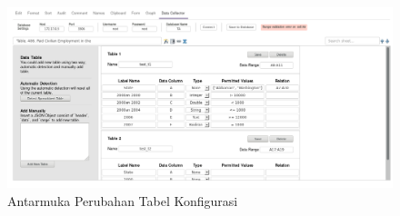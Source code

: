 	\begin{figure}[htbp]
	    \centering
	    \includegraphics[width=1.0\textwidth]{resources/chapter-4-interface-3a.png}
	    \caption{Antarmuka Perubahan Tabel Konfigurasi}
		\label{Antarmuka3}
	\end{figure}
	
